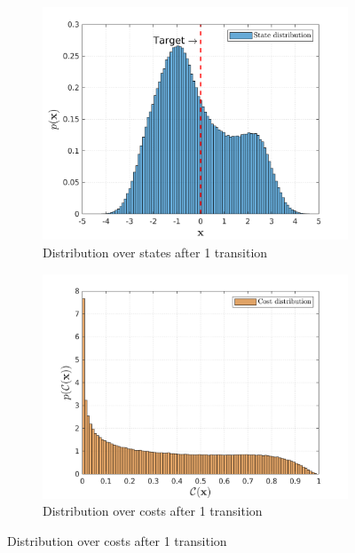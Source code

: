 \begin{figure}[htp!]
  \begin{subfigure}[b]{0.49\linewidth}
    \centering
    \includegraphics[height=0.25\textheight,width=1\textwidth]{Chapter3/Figures/trans_traj_hist_2.png} 
    \caption{Distribution over states after 1 transition} 
    \label{Fig:Re-hist-traj-2} 
  \end{subfigure} 
  \begin{subfigure}[b]{0.49\linewidth}
    \centering
    \includegraphics[height=0.25\textheight,width=1\textwidth]{Chapter3/Figures/trans_cost_hist_2.png} 
    \caption{Distribution over costs after 1 transition} 
    \label{Fig:Re-hist-cost-2} 
  \end{subfigure} 


\end{figure}
